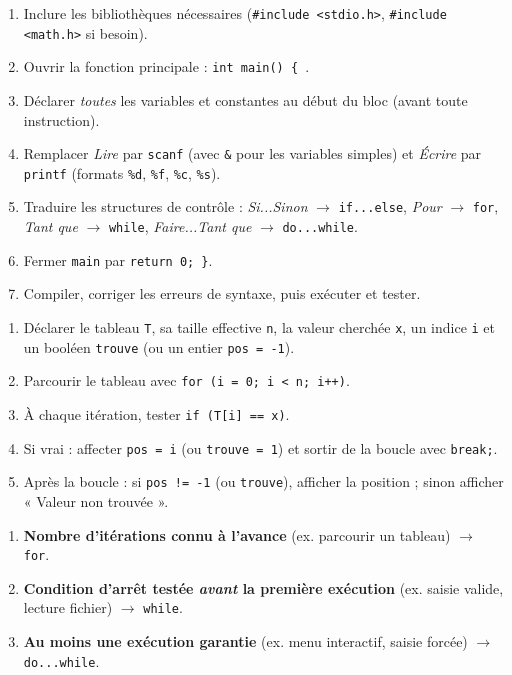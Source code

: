 \documentclass[11pt]{article}
\begin{document}
\begin{methode}
\begin{enumerate}
  \item Inclure les bibliothèques nécessaires (\texttt{\#include <stdio.h>}, \texttt{\#include <math.h>} si besoin).
  \item Ouvrir la fonction principale : \texttt{int main() \{ }.
  \item Déclarer \emph{toutes} les variables et constantes au début du bloc (avant toute instruction).
  \item Remplacer \emph{Lire} par \texttt{scanf} (avec \texttt{\&} pour les variables simples) et \emph{Écrire} par \texttt{printf} (formats \texttt{\%d}, \texttt{\%f}, \texttt{\%c}, \texttt{\%s}).
  \item Traduire les structures de contrôle : \emph{Si...Sinon} $\to$ \texttt{if...else}, \emph{Pour} $\to$ \texttt{for}, \emph{Tant que} $\to$ \texttt{while}, \emph{Faire...Tant que} $\to$ \texttt{do...while}.
  \item Fermer \texttt{main} par \texttt{return 0; \}}.
  \item Compiler, corriger les erreurs de syntaxe, puis exécuter et tester.
\end{enumerate}
\end{methode}

\begin{methode}
\begin{enumerate}
  \item Déclarer le tableau \texttt{T}, sa taille effective \texttt{n}, la valeur cherchée \texttt{x}, un indice \texttt{i} et un booléen \texttt{trouve} (ou un entier \texttt{pos = -1}).
  \item Parcourir le tableau avec \texttt{for (i = 0; i < n; i++)}.
  \item À chaque itération, tester \texttt{if (T[i] == x)}.
  \item Si vrai : affecter \texttt{pos = i} (ou \texttt{trouve = 1}) et sortir de la boucle avec \texttt{break;}.
  \item Après la boucle : si \texttt{pos != -1} (ou \texttt{trouve}), afficher la position ; sinon afficher « Valeur non trouvée ».
\end{enumerate}
\end{methode}

\begin{methode}
\begin{enumerate}
  \item \textbf{Nombre d'itérations connu à l'avance} (ex. parcourir un tableau) $\to$ \texttt{for}.
  \item \textbf{Condition d'arrêt testée \emph{avant} la première exécution} (ex. saisie valide, lecture fichier) $\to$ \texttt{while}.
  \item \textbf{Au moins une exécution garantie} (ex. menu interactif, saisie forcée) $\to$ \texttt{do...while}.
\end{enumerate}
\end{methode}
\end{document}
